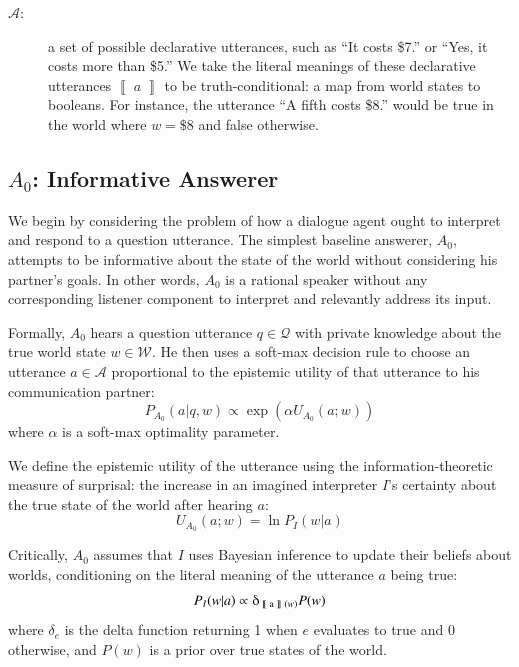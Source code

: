 \documentclass[12pt, floatsintext, jou]{apa6}
\newcommand{\den}[2][]{
\(
\left\llbracket\;\text{#2}\;\right\rrbracket^{#1}
\)
}
\newcommand{\ndg}[1]{\textcolor{Green}{[ndg: #1]}}
\begin{document}
\begin{description}
\item[$\mathcal{A}$:] a set of possible declarative utterances, such as ``It costs \$7.'' or ``Yes, it costs more than \$5.'' We take the literal meanings of these declarative utterances \den{$a$} to be truth-conditional: a map from world states to booleans. For instance, the utterance ``A fifth costs \$8.'' would be true in the world where $w = \$8$ and false otherwise. 
\end{description}

\subsection{$A_0$: Informative Answerer}

We begin by considering the problem of how a dialogue agent ought to interpret and respond to a question utterance. The simplest baseline answerer, $A_0$, attempts to be informative about the state of the world without considering his partner's goals. In other words, $A_0$ is a rational speaker without any corresponding listener component to interpret and relevantly address its input. 

Formally, $A_0$ hears a question utterance $q \in \mathcal{Q}$ with private knowledge about the true world state $w \in \mathcal{W}$. He then uses a soft-max decision rule to choose an utterance $a \in \mathcal{A}$ proportional to the epistemic utility of that utterance to his communication partner: 
$$P_{A_0}(a | q, w) \propto \exp(\alpha U_{A_0}(a;w))$$ 
where $\alpha$ is a soft-max optimality parameter. 

We define the epistemic utility of the utterance using the information-theoretic measure of surprisal: the increase in an imagined interpreter $I$'s certainty about the true state of the world after hearing $a$: 
\begin{equation}
\label{eq:A0utility}
U_{A_0}(a;w) = \ln P_I(w|a)
\end{equation}

Critically, $A_0$ assumes that $I$ uses Bayesian inference to update their beliefs about worlds, conditioning on the literal meaning of the utterance $a$ being true:
$$P_I(w|a) \propto \delta_{\textrm{\den{a}}(w)} P(w)$$
where $\delta_{e}$ is the delta function returning 1 when $e$ evaluates to true and 0 otherwise, and $P(w)$ is a prior over true states of the world. 
\end{document}
